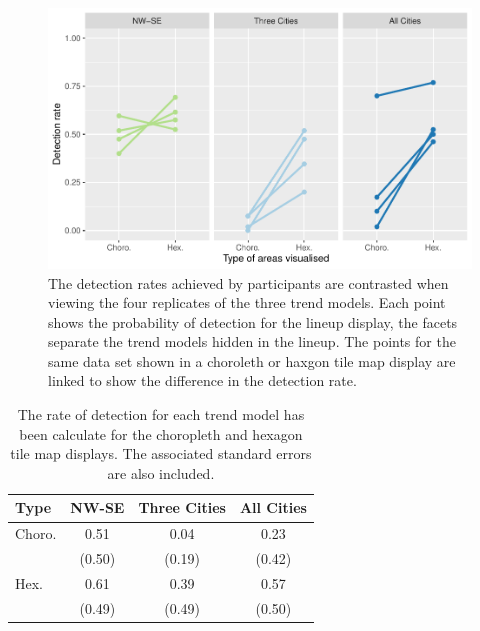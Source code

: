 \documentclass[conference,final,]{IEEEtran}
\makeatletter
\def\maxwidth{\ifdim\Gin@nat@width>\linewidth\linewidth
\else\Gin@nat@width\fi}
\let\Oldincludegraphics\includegraphics
\renewcommand{\includegraphics}[1]{\Oldincludegraphics[width=\maxwidth]{#1}}
\makeatother
\begin{document}
\begin{figure}
\centering
\includegraphics{paper_files/figure-latex/detect-compare-1.pdf}
\caption{\label{fig:detect-compare}The detection rates achieved by participants are contrasted when viewing the four replicates of the three trend models. Each point shows the probability of detection for the lineup display, the facets separate the trend models hidden in the lineup. The points for the same data set shown in a choroleth or haxgon tile map display are linked to show the difference in the detection rate.}
\end{figure}

\begin{table}

\caption{\label{tab:desc-stats}The rate of detection for each trend model has been calculate for the choropleth and hexagon tile map displays. The associated standard errors are also included.}
\centering
\begin{tabular}[t]{lccc}
\toprule
Type & NW-SE & Three Cities & All Cities\\
\midrule
Choro. & 0.51 & 0.04 & 0.23\\
 & (0.50) & (0.19) & (0.42)\\
\addlinespace
Hex. & 0.61 & 0.39 & 0.57\\
 & (0.49) & (0.49) & (0.50)\\
\bottomrule
\end{tabular}
\end{table}
\end{document}
